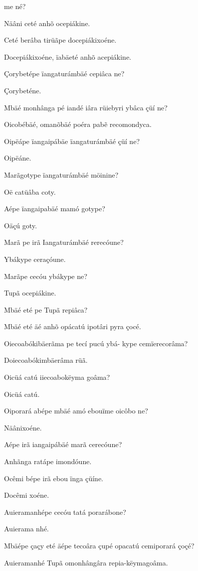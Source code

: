 \documentclass[openany,titlepage,12pt]{book}
\begin{document}
\begin{altereven}
    me né?
    \item Näâni ceté anhõ ocepiákine.
    \item Ceté berâba tirüãpe docepiákixoéne.
    \item Docepiákixoéne, ïabäeté anhõ acepiákine.
    \item Çorybetépe ïangaturámbäé cepiâca ne?
    \item Çorybeténe.
    \item Mbäé monhânga pé iandé iâra rüiebyri ybâca çüí ne?
    \item Oicobébäé, omanõbäé poéra pab\~e recomondyca.
    \item Oipëápe ïangaipábäe ïangaturámbäé çüí ne?
    \item Oipëáne.
    \item Marãgotype ïangaturámbäé möinine?
    \item Oë catüâba coty.
    \item Aépe ïangaipabäé mamó gotype?
    \item Oäçú goty.
    \item Marã pe irã Iangaturámbäé rerecóune?
    \item Ybákype ceraçóune.
    \item Marãpe cecóu ybákype ne?
    \item Tupã ocepiákine.
    \item Mbäé eté pe Tupã repiâca?
    \item Mbäé eté äé anhõ opácatú ipotâri pyra çocé.
    \newpage
    \item Oiecoabókibäerãma pe tecí pucú ybá-\linebreak
    kype cemïerecorâma?
    \item Doiecoabókimbäerâma rüã.
    \item Oicüá catú iiecoabokëyma goâma?
    \item Oicüá catú.
    \item Oiporará abépe mbäé amó ebouïme oicôbo ne?
    \item Näânixoéne.
    \item Aépe irã iangaipábäé marã cerecóune?
    \item Anhãnga ratápe imondóune.
    \item Ocêmi bépe irã ebou ïnga çüíne.
    \item Docêmi xoéne.
    \item Auieramanhépe cecóu tatá porarábone?
    \item Auierama nhé.
    \item Mbäépe çaçy eté äépe tecoâra çupé opacatú
    cemiporará çoçé?
    \item Auieramanhé Tupã omonhângâra repia-këymagoâma.
    
\end{altereven}
\end{document}
